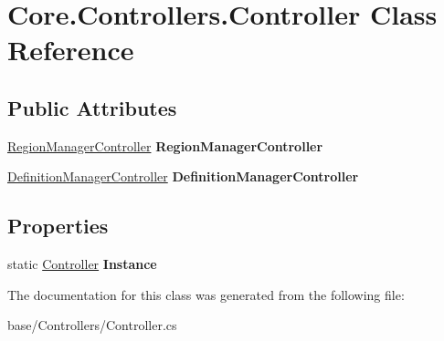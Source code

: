 \hypertarget{classCore_1_1Controllers_1_1Controller}{\section{Core.\-Controllers.\-Controller Class Reference}
\label{classCore_1_1Controllers_1_1Controller}
}
\subsection*{Public Attributes}
\begin{DoxyCompactItemize}
\item 
\hypertarget{classCore_1_1Controllers_1_1Controller_a13c0a9251d550621898cffbfcfc732a7}{\hyperlink{classCore_1_1Controllers_1_1RegionManagerController}{Region\-Manager\-Controller} {\bfseries Region\-Manager\-Controller}}\label{classCore_1_1Controllers_1_1Controller_a13c0a9251d550621898cffbfcfc732a7}

\item 
\hypertarget{classCore_1_1Controllers_1_1Controller_a607c9eb803a7f9ec2e60b96827ef26ae}{\hyperlink{classCore_1_1Controllers_1_1DefinitionManagerController}{Definition\-Manager\-Controller} {\bfseries Definition\-Manager\-Controller}}\label{classCore_1_1Controllers_1_1Controller_a607c9eb803a7f9ec2e60b96827ef26ae}

\end{DoxyCompactItemize}
\subsection*{Properties}
\begin{DoxyCompactItemize}
\item 
\hypertarget{classCore_1_1Controllers_1_1Controller_a083108465e3ad1fc6ccdd7f0c20ef5cb}{static \hyperlink{classCore_1_1Controllers_1_1Controller}{Controller} {\bfseries Instance}}\label{classCore_1_1Controllers_1_1Controller_a083108465e3ad1fc6ccdd7f0c20ef5cb}

\end{DoxyCompactItemize}


The documentation for this class was generated from the following file\-:\begin{DoxyCompactItemize}
\item 
base/\-Controllers/Controller.\-cs\end{DoxyCompactItemize}
